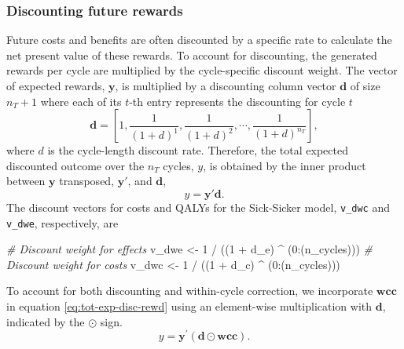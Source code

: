 \documentclass[
]{article}
\newenvironment{Shaded}{\begin{snugshade}}{\end{snugshade}}
\newcommand{\CommentTok}[1]{\textcolor[rgb]{0.56,0.35,0.01}{\textit{#1}}}
\newcommand{\DecValTok}[1]{\textcolor[rgb]{0.00,0.00,0.81}{#1}}
\newcommand{\NormalTok}[1]{#1}
\newcommand{\OtherTok}[1]{\textcolor[rgb]{0.56,0.35,0.01}{#1}}
\newcommand{\SpecialCharTok}[1]{\textcolor[rgb]{0.00,0.00,0.00}{#1}}
\begin{document}
\hypertarget{discounting-future-rewards}{%
\subsubsection{Discounting future rewards}\label{discounting-future-rewards}}

Future costs and benefits are often discounted by a specific rate to calculate the net present value of these rewards. To account for discounting, the generated rewards per cycle are multiplied by the cycle-specific discount weight. The vector of expected rewards, \(\mathbf{y}\), is multiplied by a discounting column vector \(\mathbf{d}\) of size \(n_T+1\) where each of its \(t\)-th entry represents the discounting for cycle \(t\)
\[
  \mathbf{d} = \left[1, \frac{1}{(1+d)^{1}}, \frac{1}{(1+d)^{2}}, \cdots, \frac{1}{(1+d)^{n_T}}\right],
\]
where \(d\) is the cycle-length discount rate. Therefore, the total expected discounted outcome over the \(n_T\) cycles, \(y\), is obtained by the inner product between \(\mathbf{y}\) transposed, \(\mathbf{y'}\), and \(\mathbf{d}\),
\begin{equation}
 y = \mathbf{y'} \mathbf{d}.
 \label{eq:tot-exp-disc-rewd}
\end{equation}
The discount vectors for costs and QALYs for the Sick-Sicker model, \texttt{v\_dwc} and \texttt{v\_dwe}, respectively, are

\begin{Shaded}
\begin{Highlighting}[]
\CommentTok{\# Discount weight for effects}
\NormalTok{v\_dwe }\OtherTok{\textless{}{-}} \DecValTok{1} \SpecialCharTok{/}\NormalTok{ ((}\DecValTok{1} \SpecialCharTok{+}\NormalTok{ d\_e) }\SpecialCharTok{\^{}}\NormalTok{ (}\DecValTok{0}\SpecialCharTok{:}\NormalTok{(n\_cycles)))  }
\CommentTok{\# Discount weight for costs }
\NormalTok{v\_dwc }\OtherTok{\textless{}{-}} \DecValTok{1} \SpecialCharTok{/}\NormalTok{ ((}\DecValTok{1} \SpecialCharTok{+}\NormalTok{ d\_c) }\SpecialCharTok{\^{}}\NormalTok{ (}\DecValTok{0}\SpecialCharTok{:}\NormalTok{(n\_cycles)))    }
\end{Highlighting}
\end{Shaded}

To account for both discounting and within-cycle correction, we incorporate \(\mathbf{wcc}\) in equation \eqref{eq:tot-exp-disc-rewd} using an element-wise multiplication with \(\mathbf{d}\), indicated by the \(\odot\) sign.
\begin{equation}
 y = \mathbf{y}^{'} \left(\mathbf{d} \odot \mathbf{wcc}\right).
 \label{eq:tot-exp-disc-rewd-wcc}
\end{equation}
\end{document}
